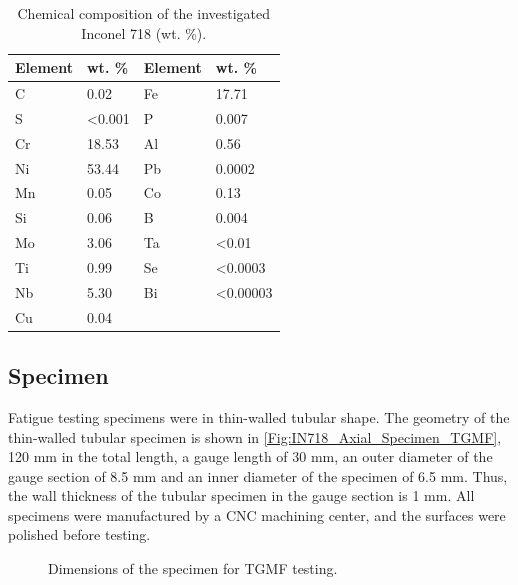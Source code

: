 \documentclass[preprint,5p,twocolumn,11pt,sort&compress]{elsarticle}
\begin{document}
\begin{table}[htbp]
  \centering
  \caption{Chemical composition of the investigated Inconel 718 (wt. \%).}
    \begin{tabular}{llll}
    \toprule
    Element & wt. \% & Element & wt. \% \\
    \midrule
    C     & 0.02  & Fe    & 17.71 \\
    S     & <0.001 & P     & 0.007 \\
    Cr    & 18.53 & Al    & 0.56 \\
    Ni    & 53.44 & Pb    & 0.0002 \\
    Mn    & 0.05  & Co    & 0.13 \\
    Si    & 0.06  & B     & 0.004 \\
    Mo    & 3.06  & Ta    & <0.01 \\
    Ti    & 0.99  & Se    & <0.0003 \\
    Nb    & 5.30  & Bi    & <0.00003 \\
    Cu    & 0.04  &       &  \\
    \bottomrule
    \end{tabular}%
  \label{Tab:ChemicalCompositionofIN718}
\end{table}

\subsection{Specimen}
Fatigue testing specimens were in thin-walled tubular shape. The geometry of the thin-walled tubular specimen is shown in \autoref{Fig:IN718_Axial_Specimen_TGMF}, 120 mm in the total length, a gauge length of 30 mm, an outer diameter of the gauge section of 8.5 mm and an inner diameter of the specimen of 6.5 mm. Thus, the wall thickness of the tubular specimen in the gauge section is 1 mm. All specimens were manufactured by a CNC machining center, and the surfaces were polished before testing. 

\begin{figure}[!htp]
\caption{Dimensions of the specimen for TGMF testing.}
\label{Fig:IN718_Axial_Specimen_TGMF}
\end{figure}
\end{document}
